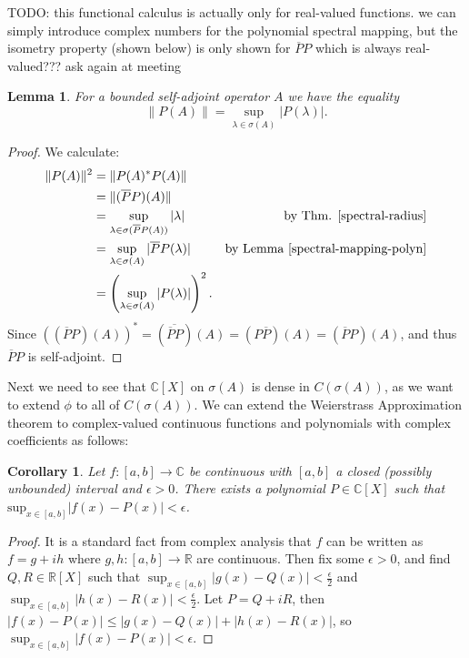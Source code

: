 \documentclass[12pt,oneside]{report}
\newtheorem{cor}[thm]{Corollary}
\newtheorem{lem}[thm]{Lemma}
\begin{document}
 TODO: this functional calculus is actually only for real-valued functions. we can simply introduce complex numbers for the polynomial spectral mapping, but the isometry property (shown below) is only shown for $\overline{P}P$ which is always real-valued??? ask again at meeting

\begin{lem}
    For a bounded self-adjoint operator $A$ we have the equality $$\|P(A)\| = \sup_{\lambda \in \sigma(A)} |P(\lambda)|.$$
\end{lem}
\begin{proof}
    We calculate:
\begin{align*}
\|P(A)\|^{2} &= \|P(A)^{*}P(A)\| \\
&= \|(\overline{P}P)(A)\| \\
&= \sup_{\lambda \in \sigma(\overline{P}P(A))} |\lambda| & \text{by Thm. \ref{spectral-radius}} \\
&= \sup_{\lambda \in \sigma(A)} |\overline{P}P(\lambda)| & \text{by Lemma \ref{spectral-mapping-polyn}} \\
&= \left( \sup_{\lambda \in \sigma(A)} |P(\lambda)| \right)^{2}.
\end{align*}
Since $((\overline{P}P)(A))^{*} = (\overline{\overline{P}P})(A) = (P\overline{P})(A) = (\overline{P}P)(A)$, and thus $\overline{P}P$ is self-adjoint.
\end{proof}

Next we need to see that $\mathbb{C}[X]$ on $\sigma(A)$ is dense in $C(\sigma(A))$, as we want to extend $\phi$ to all of $C(\sigma(A))$. We can extend the Weierstrass Approximation theorem to complex-valued continuous functions and polynomials with complex coefficients as follows:

\begin{cor}
    Let $f: [a,b] \to \mathbb{\mathbb{C}}$ be continuous with $[a,b]$ a closed (possibly unbounded) interval and $\epsilon > 0$. There exists a polynomial $P \in \mathbb{\mathbb{C}}[X]$ such that $\text{sup}_{x \in [a,b]}|f(x) - P(x)| < \epsilon$.
\end{cor}
\begin{proof}
    It is a standard fact from complex analysis that $f$ can be written as $f = g + ih$ where $g,h: [a,b] \to \mathbb{R}$ are continuous. Then fix some $\epsilon > 0$, and find $Q,R \in \mathbb{R}[X]$ such that $\sup_{x\in[a,b]} |g(x) - Q(x)| < \frac{\epsilon}{2}$ and $\sup_{x\in[a,b]} |h(x) - R(x)| < \frac{\epsilon}{2}$. Let $P = Q + iR$, then $|f(x) - P(x)| \leq |g(x) - Q(x)| + |h(x) - R(x)|$, so $\sup_{x\in[a,b]}|f(x) - P(x)| < \epsilon$.
\end{proof}
\end{document}
